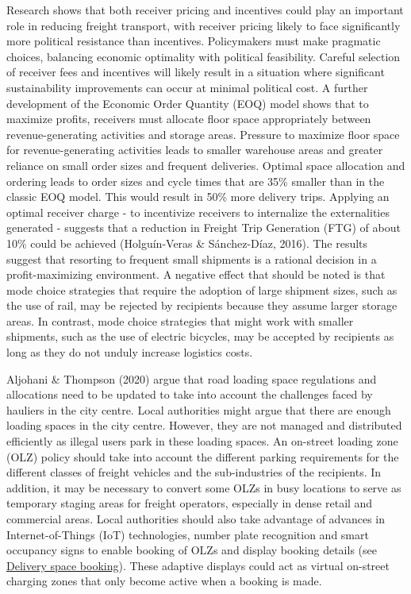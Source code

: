 \documentclass[
]{book}
\begin{document}
Research shows that both receiver pricing and incentives could play an important role in reducing freight transport, with receiver pricing likely to face significantly more political resistance than incentives. Policymakers must make pragmatic choices, balancing economic optimality with political feasibility. Careful selection of receiver fees and incentives will likely result in a situation where significant sustainability improvements can occur at minimal political cost. A further development of the Economic Order Quantity (EOQ) model shows that to maximize profits, receivers must allocate floor space appropriately between revenue-generating activities and storage areas. Pressure to maximize floor space for revenue-generating activities leads to smaller warehouse areas and greater reliance on small order sizes and frequent deliveries. Optimal space allocation and ordering leads to order sizes and cycle times that are 35\% smaller than in the classic EOQ model. This would result in 50\% more delivery trips. Applying an optimal receiver charge - to incentivize receivers to internalize the externalities generated - suggests that a reduction in Freight Trip Generation (FTG) of about 10\% could be achieved (Holguín-Veras \& Sánchez-Díaz, 2016). The results suggest that resorting to frequent small shipments is a rational decision in a profit-maximizing environment. A negative effect that should be noted is that mode choice strategies that require the adoption of large shipment sizes, such as the use of rail, may be rejected by recipients because they assume larger storage areas. In contrast, mode choice strategies that might work with smaller shipments, such as the use of electric bicycles, may be accepted by recipients as long as they do not unduly increase logistics costs.

Aljohani \& Thompson (2020) argue that road loading space regulations and allocations need to be updated to take into account the challenges faced by hauliers in the city centre. Local authorities might argue that there are enough loading spaces in the city centre. However, they are not managed and distributed efficiently as illegal users park in these loading spaces. An on-street loading zone (OLZ) policy should take into account the different parking requirements for the different classes of freight vehicles and the sub-industries of the recipients. In addition, it may be necessary to convert some OLZs in busy locations to serve as temporary staging areas for freight operators, especially in dense retail and commercial areas. Local authorities should also take advantage of advances in Internet-of-Things (IoT) technologies, number plate recognition and smart occupancy signs to enable booking of OLZs and display booking details (see \protect\hyperlink{space_book}{Delivery space booking}). These adaptive displays could act as virtual on-street charging zones that only become active when a booking is made.
\end{document}
